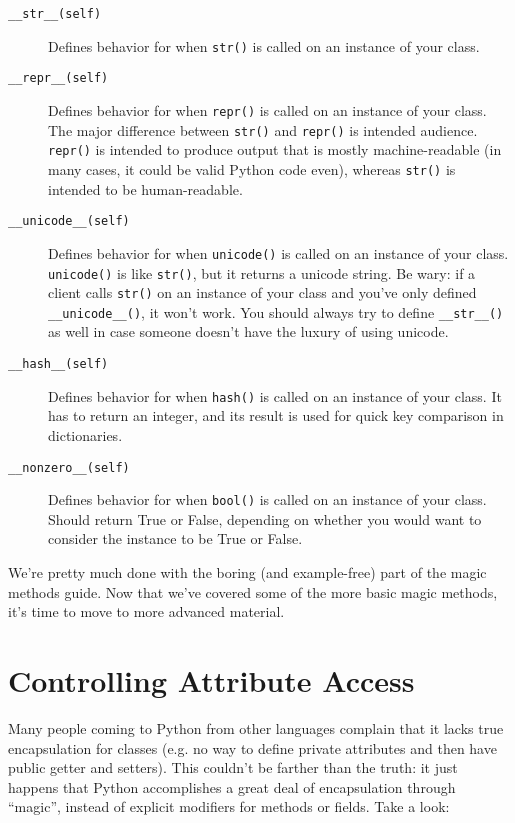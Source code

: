 \documentclass[a4paper,11pt]{article}
\newcommand{\code}[1]{\texttt{#1}}
\begin{document}
\begin{description}

\item[\code{__str__(self)}]
Defines behavior for when \code{str()} is called on an instance of your class.
\item[\code{__repr__(self)}]
Defines behavior for when \code{repr()} is called on an instance of your class. The major difference between \code{str()} and \code{repr()} is intended audience. \code{repr()} is intended to produce output that is mostly machine-readable (in many cases, it could be valid Python code even), whereas \code{str()} is intended to be human-readable.
\item[\code{__unicode__(self)}]
Defines behavior for when \code{unicode()} is called on an instance of your class. \code{unicode()} is like \code{str()}, but it returns a unicode string. Be wary: if a client calls \code{str()} on an instance of your class and you've only defined \code{__unicode__()}, it won't work. You should always try to define \code{__str__()} as well in case someone doesn't have the luxury of using unicode.
\item[\code{__hash__(self)}]
Defines behavior for when \code{hash()} is called on an instance of your class. It has to return an integer, and its result is used for quick key comparison in dictionaries.
\item[\code{__nonzero__(self)}]
Defines behavior for when \code{bool()} is called on an instance of your class. Should return True or False, depending on whether you would want to consider the instance to be True or False.

\end{description}

\noindent
We're pretty much done with the boring (and example-free) part of the magic methods guide. Now that we've covered some of the more basic magic methods, it's time to move to more advanced material.

\section{Controlling Attribute Access}

Many people coming to Python from other languages complain that it lacks true encapsulation for classes (e.g. no way to define private attributes and then have public getter and setters). This couldn't be farther than the truth: it just happens that Python accomplishes a great deal of encapsulation through ``magic'', instead of explicit modifiers for methods or fields. Take a look:
\end{document}

